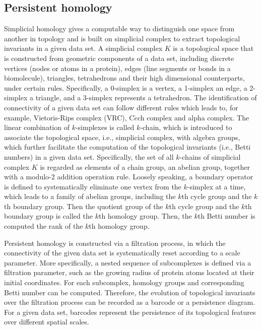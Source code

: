 \documentclass[10pt]{article}
\begin{document}
\subsection{Persistent homology}\label{sec:PH}
 

Simplicial homology gives a computable way to distinguish one space from another in topology and is built on   simplicial complex to extract topological invariants in a given data set. A simplicial complex $K$ is a topological space that is constructed from geometric components of a data set, including  discrete vertices (nodes or atoms in a protein), edges (line segments or bonds in a biomolecule), triangles,  tetrahedrons and their high dimensional counterparts, under certain rules.   Specifically, a 0-simplex is a vertex, a 1-simplex  an edge, a 2-simplex  a triangle, and a 3-simplex represents a tetrahedron.  The identification of connectivity of a given data set can follow different rules which leads to, for example,  Vietoris-Rips complex (VRC), C$\check{e}$ch complex and alpha complex. The linear combination of $k$-simplexes is called $k$-chain, which is introduced to associate the topological space,  i.e., simplicial complex, with algebra groups, which further facilitate the computation of the topological invariants (i.e., Betti numbers) in a given data set. Specifically, the set of all $k$-chains of simplicial complex $K$  is regarded as elements of a  chain group, an  abelian group, together with a modulo-2 addition operation rule. Loosely speaking, a boundary operator is defined to systematically eliminate one vertex from the $k$-simplex at a time, which leads to a family of abelian groups, including the $k$th cycle group and the $k$th boundary group. Then  the quotient group of the $k$th cycle group and the $k$th boundary group is called the $k$th homology group.  Then, 
the $k$th Betti number is computed the  rank of the $k$th homology group. 
%

Persistent homology is constructed via a filtration process, in which the connectivity of the given data set is systematically reset according to a scale parameter. More specifically, a  nested sequence of subcomplexes is defined via a filtration parameter, such as the growing radius of protein atoms located at their initial coordinates. For each  subcomplex, homology groups and corresponding Betti number can be computed. Therefore, the evolution of topological invariants over the filtration process can be recorded as  a barcode  \cite{Ghrist:2008} or a persistence diagram.   For a given data set, barcodes represent the persistence of its topological features over different spatial scales.   
\end{document}
